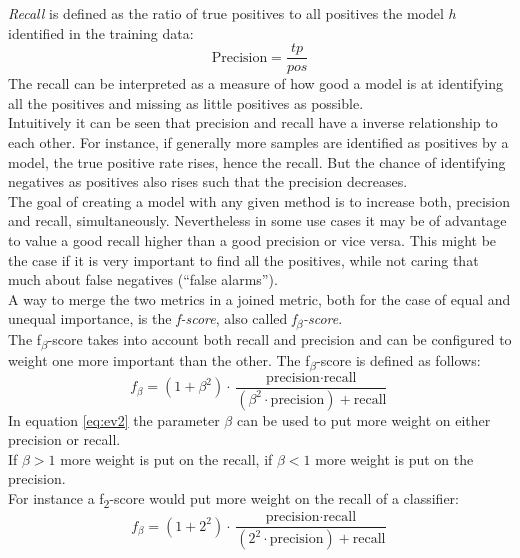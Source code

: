 \emph{Recall} is defined as the ratio of true positives to all positives the model $h$ identified in the training data:
\begin{equation} \label{eq:ev1}
\text{Precision}=\frac{tp}{pos}
\end{equation}
The recall can be interpreted as a measure of how good a model is at identifying all the positives and missing as little positives as possible.
\\

Intuitively it can be seen that precision and recall have a inverse relationship to each other. For instance, if generally more samples are identified as positives by a model, the true positive rate rises, hence the recall. But the chance of identifying negatives as positives also rises such that the precision decreases.
\\
The goal of creating a model with any given method is to increase both, precision and recall, simultaneously. Nevertheless in some use cases it may be of advantage to value a good recall higher than a good precision or vice versa. This might be the case if it is very important to find all the positives, while not caring that much about false negatives (``false alarms'').
\\

A way to merge the two metrics in a joined metric, both for the case of equal and  unequal importance, is the \emph{f-score}, also called \emph{f\textsubscript{$\beta$}-score}.
\\
The f\textsubscript{$\beta$}-score takes into account both recall and precision and can be configured to weight one more important than the other. The f\textsubscript{$\beta$}-score is defined as follows:
\begin{equation} \label{eq:ev2}
f_\beta = (1+\beta^2) \cdot \frac{\text{precision} \cdot \text{recall}}{(\beta^2 \cdot \text{precision}) + \text{recall}}
\end{equation}
In equation \ref{eq:ev2} the parameter $\beta$ can be used to put more weight on either precision or recall. 
\\
If  $\beta>1$ more weight is put on the recall,  if  $\beta<1$ more weight is put on the precision.
\\
For instance a f\textsubscript{2}-score  would put more weight on the recall of a classifier:
\begin{equation} \label{eq:ev3}
f_\beta = (1+2^2) \cdot \frac{\text{precision} \cdot \text{recall}}{(2^2 \cdot \text{precision}) + \text{recall}}
\end{equation}	

